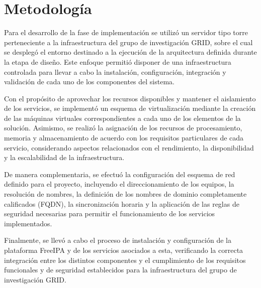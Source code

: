 \section{Metodología}\label{sec:metodologia-implementacio}

Para el desarrollo de la fase de implementación se utilizó un servidor tipo torre perteneciente a la infraestructura del grupo de investigación \ac{GRID}, sobre el cual se desplegó el entorno destinado a la ejecución de la arquitectura definida durante la etapa de diseño. Este enfoque permitió disponer de una infraestructura controlada para llevar a cabo la instalación, configuración, integración y validación de cada uno de los componentes del sistema.

Con el propósito de aprovechar los recursos disponibles y mantener el aislamiento de los servicios, se implementó un esquema de virtualización mediante la creación de las máquinas virtuales correspondientes a cada uno de los elementos de la solución. Asimismo, se realizó la asignación de los recursos de procesamiento, memoria y almacenamiento de acuerdo con los requisitos particulares de cada servicio, considerando aspectos relacionados con el rendimiento, la disponibilidad y la escalabilidad de la infraestructura.

De manera complementaria, se efectuó la configuración del esquema de red definido para el proyecto, incluyendo el direccionamiento de los equipos, la resolución de nombres, la definición de los nombres de dominio completamente calificados (\ac{FQDN}), la sincronización horaria y la aplicación de las reglas de seguridad necesarias para permitir el funcionamiento de los servicios implementados.

Finalmente, se llevó a cabo el proceso de instalación y configuración de la plataforma FreeIPA y de los servicios asociados a esta, verificando la correcta integración entre los distintos componentes y el cumplimiento de los requisitos funcionales y de seguridad establecidos para la infraestructura del grupo de investigación \ac{GRID}.

